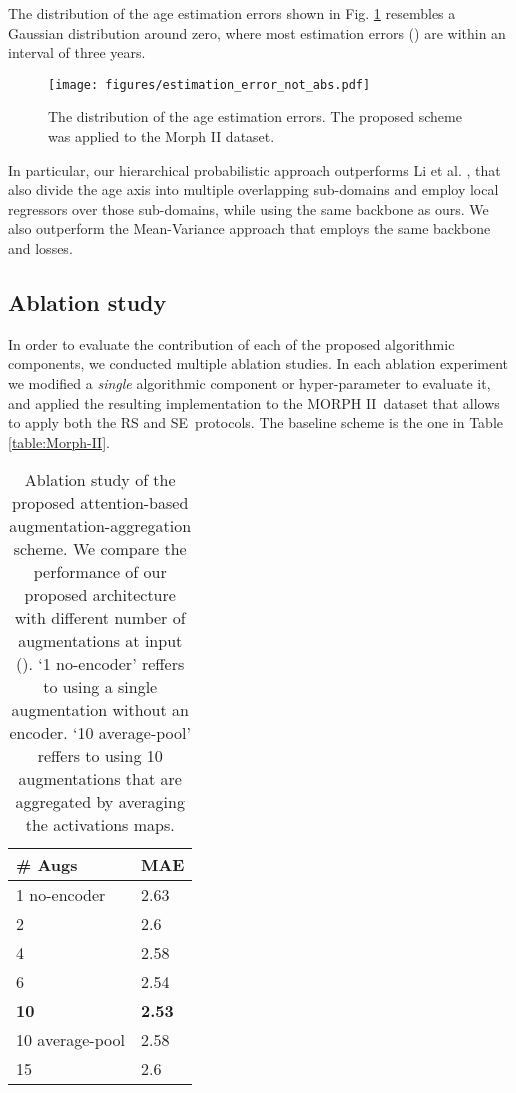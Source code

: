 \documentclass[10pt,twocolumn,letterpaper]{article}
\begin{document}
The distribution of the age estimation errors shown in Fig. \ref {fig:estimation_error} resembles a Gaussian distribution around zero, where
most estimation errors () are within an interval of three
years.
\begin{figure}[tbp]
\centering\texttt{[image: figures/estimation\_error\_not\_abs.pdf]}
\caption{The distribution of the age estimation errors. The proposed scheme
was applied to the Morph II dataset.}
\label{fig:estimation_error}
\end{figure}
In particular, our hierarchical probabilistic approach outperforms Li et al.
\cite{8954134}, that also divide the age axis into multiple overlapping
sub-domains and employ local regressors over those sub-domains, while using
the same backbone as ours. We also outperform the Mean-Variance approach
\cite{Mean-Variance} that employs the same backbone and losses.
\subsection{Ablation study}

\label{subsec:Ablation study}

In order to evaluate the contribution of each of the proposed algorithmic
components, we conducted multiple ablation studies. In each ablation
experiment we modified a \textit{single} algorithmic component or
hyper-parameter to evaluate it, and applied the resulting implementation to
the MORPH II\ dataset that allows to apply both the RS and SE\ protocols.
The baseline scheme is the one in Table \ref{table:Morph-II}.
\begin{table}[tbh]
\begin{center}
\centering \begin{tabular}{l|l}
\hline
\# Augs & MAE \\ \hline\hline
1 no-encoder & 2.63 \\
2 & 2.6 \\
4 & 2.58 \\
6 & 2.54 \\
\textbf{10} & \textbf{2.53} \\
10 average-pool & 2.58 \\
15 & 2.6 \\ \hline
\end{tabular}\end{center}
\caption{Ablation study of the proposed attention-based
augmentation-aggregation scheme. We compare the performance of our proposed
architecture with different number of augmentations at input (). `1
no-encoder' reffers to using a single augmentation without an encoder. `10
average-pool' reffers to using 10 augmentations that are aggregated by
averaging the activations maps.}
\label{table:ablation-aug}
\end{table}
\end{document}
